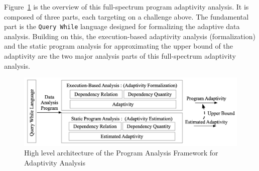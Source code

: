 
Figure~\ref{fig:structure} is the overview of this full-spectrum program adaptivity analysis.
It is composed of three parts, each targeting on a challenge above.
The fundamental part is the {\tt Query While} language designed for formalizing the 
adaptive data analysis. Building on this, 
the execution-based adaptivity analysis (formalization)
and the static program analysis for approximating the upper bound of the 
adaptivity are the two major analysis parts of this full-spectrum adaptivity analysis.
\begin{figure}
   \centering   
   \includegraphics[width=1.0\textwidth]{figures/overview.png}
  \caption{High level architecture of the Program Analysis Framework for Adaptivity Analysis}
   \label{fig:structure}
\end{figure}
